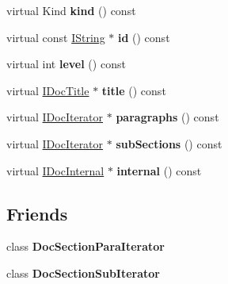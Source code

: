 \begin{DoxyCompactItemize}
virtual Kind {\bfseries kind} () const
\item 
\mbox{\label{class_doc_section_handler_a7e1cf291b50097ca4ca549408e298326}} 
virtual const \mbox{\hyperlink{class_i_string}{I\+String}} $\ast$ {\bfseries id} () const
\item 
\mbox{\label{class_doc_section_handler_af8938e1bc010b3752e6a3a1f60af9852}} 
virtual int {\bfseries level} () const
\item 
\mbox{\label{class_doc_section_handler_a69f9ec817d38a467da4d086b201bcb5d}} 
virtual \mbox{\hyperlink{class_i_doc_title}{I\+Doc\+Title}} $\ast$ {\bfseries title} () const
\item 
\mbox{\label{class_doc_section_handler_add419e8baf3b8a4f3244a3ef91cf8d6d}} 
virtual \mbox{\hyperlink{class_i_doc_iterator}{I\+Doc\+Iterator}} $\ast$ {\bfseries paragraphs} () const
\item 
\mbox{\label{class_doc_section_handler_aa6cfe3fb36de0d55b3010c68fbe82c20}} 
virtual \mbox{\hyperlink{class_i_doc_iterator}{I\+Doc\+Iterator}} $\ast$ {\bfseries sub\+Sections} () const
\item 
\mbox{\label{class_doc_section_handler_a54154de33b045dbec1c64026f2317ab7}} 
virtual \mbox{\hyperlink{class_i_doc_internal}{I\+Doc\+Internal}} $\ast$ {\bfseries internal} () const
\end{DoxyCompactItemize}
\subsection*{Friends}
\begin{DoxyCompactItemize}
\item 
\mbox{\label{class_doc_section_handler_a00e1b67a8135cef1d0459b44297d45d6}} 
class {\bfseries Doc\+Section\+Para\+Iterator}
\item 
\mbox{\label{class_doc_section_handler_ab4008c030968a91d2d5e3a0f31baddcb}} 
class {\bfseries Doc\+Section\+Sub\+Iterator}
\end{DoxyCompactItemize}
